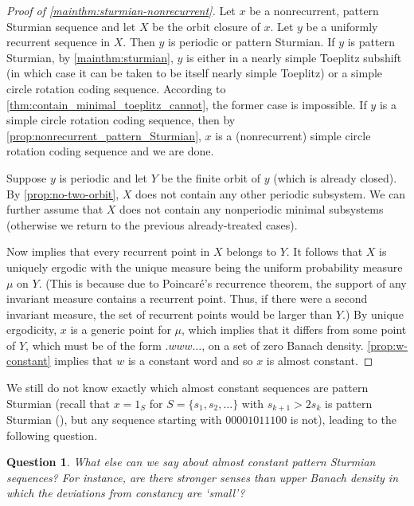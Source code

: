 \documentclass[11pt,reqno]{amsart}
\newtheorem{question}[theorem]{Question}
\theoremstyle{definition}
\theoremstyle{plain}
\begin{document}
\begin{proof}[Proof of \cref{mainthm:sturmian-nonrecurrent}]


Let $x$ be a nonrecurrent, pattern Sturmian sequence and let $X$ be the orbit closure of $x$. Let $y$ be a uniformly recurrent sequence in $X$. Then $y$ is periodic or pattern Sturmian. If $y$ is pattern Sturmian, by \cref{mainthm:sturmian}, $y$ is either in a nearly simple Toeplitz subshift (in which case it can be taken to be itself nearly simple Toeplitz) or a simple circle rotation coding sequence. According to  \cref{thm:contain_minimal_toeplitz_cannot}, the former case is impossible. If $y$ is a simple circle rotation coding sequence, then by \cref{prop:nonrecurrent_pattern_Sturmian}, $x$ is a (nonrecurrent) simple circle rotation coding sequence %
and we are done. 

Suppose $y$ is periodic and let $Y$ be the finite orbit of $y$ (which is already closed). By \cref{prop:no-two-orbit}, $X$ does not contain any other periodic subsystem. We can further assume that $X$ does not contain any nonperiodic minimal subsystems (otherwise we return to the previous already-treated cases). 

Now  implies that every recurrent point in $X$ belongs to $Y$. It follows that $X$ is uniquely ergodic with the unique measure being the uniform probability measure $\mu$ on $Y$. (This is because due to Poincar\'e's recurrence theorem, the support of any invariant measure contains a recurrent point. Thus, if there were a second invariant measure, the set of recurrent points would be larger than $Y$.) 
By unique ergodicity, $x$ is a generic point for $\mu$, which implies that it differs from some point of $Y$, which must be of the form $.www\ldots$, on a set of zero Banach density. \cref{prop:w-constant} implies that $w$ is a constant word and so $x$ is almost constant. 
\end{proof}

We still do not know exactly which almost constant sequences are pattern Sturmian (recall that $x = 1_S$ for $S = \{s_1, s_2, \ldots\}$ with $s_{k+1} > 2s_k$ is pattern Sturmian (\cite{Kamae-Zamboni-sequence_entropy}), but any sequence starting with $00001011100$ is not), leading to the following question.

\begin{question}\label{q:almcon}
What else can we say about almost constant pattern Sturmian sequences? For instance, are there stronger senses than upper Banach density in which the deviations from constancy are `small'?
\end{question}
\end{document}
